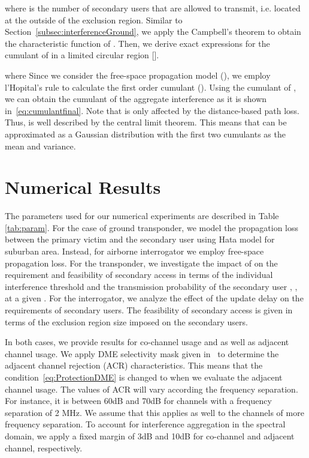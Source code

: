 \documentclass[12pt,submission,journal,onecolumn]{IEEEtran}
\begin{document}
where  is the number of secondary users that are allowed to transmit, i.e. located at the outside of the exclusion region. Similar to Section~\ref{subsec:interferenceGround}, we apply the Campbell's theorem to obtain the characteristic function of . Then, we derive exact expressions for the  cumulant of  in a limited circular region [].

where  Since we consider the free-space propagation model (), we employ l'Hopital's rule to calculate the first order cumulant ().
Using the cumulant of , we can obtain the  cumulant of the aggregate interference  as it is shown in~\eqref{eq:cumulantfinal}.
Note that  is only affected by the distance-based path loss. Thus,  is well described by the central limit theorem. This means that  can be approximated as a Gaussian distribution with the first two cumulants as the mean and variance.


\section{Numerical Results}
\label{sec:NumericalResults}
The parameters used for our numerical experiments are described in Table \ref{tab:param}. For the case of ground transponder, we model the propagation loss between the primary victim and the secondary user using Hata model for suburban area. Instead, for airborne interrogator we employ free-space propagation loss. For the transponder, we investigate the impact of  on the requirement and feasibility of secondary access in terms of the individual interference threshold  and the transmission probability of the secondary user , , at a given . For the interrogator, we analyze the effect of the update delay on the requirements of secondary users. The feasibility of secondary access is given in terms of the exclusion region size  imposed on the secondary users.

In both cases, we provide results for co-channel usage and as well as adjacent channel usage. We apply DME selectivity mask given in~\cite{ecc96} to determine the adjacent channel rejection (ACR) characteristics. This means that the condition~\eqref{eq:ProtectionDME} is changed to  when we evaluate the adjacent channel usage. The values of ACR will vary according the frequency separation. For instance, it is between 60dB and 70dB for channels with a frequency separation of 2 MHz. We assume that this applies as well to the channels of more frequency separation. To account for interference aggregation in the spectral domain, we apply a fixed margin of 3dB and 10dB for co-channel and adjacent channel, respectively.
\end{document}
